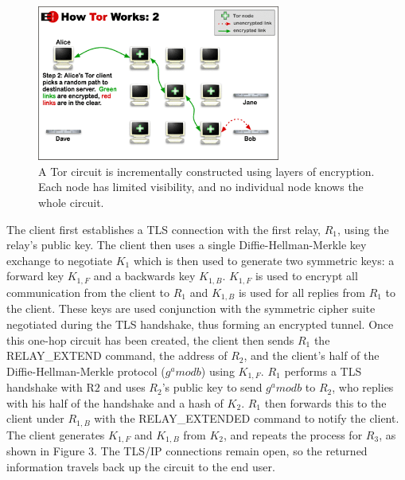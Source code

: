 \documentclass[journal]{IEEEtran}
\begin{document}
\begin{figure}[htbp]
\centering
\begin{minipage}{8 cm}
    \includegraphics[width=80mm]{resources/circuit-building-2.png}
    \caption{A Tor circuit is incrementally constructed using layers of encryption. Each node has limited visibility, and no individual node knows the whole circuit.\cite{TorOverview}}
\end{minipage}
\end{figure}

The client first establishes a TLS connection with the first relay, $R_{1}$, using the relay's public key. The client then uses a single Diffie-Hellman-Merkle key exchange to negotiate $K_{1}$ which is then used to generate two symmetric keys: a forward key $K_{1,F}$ and a backwards key $K_{1,B}$. $K_{1,F}$ is used to encrypt all communication from the client to $R_{1}$ and $K_{1,B}$ is used for all replies from $R_{1}$ to the client. These keys are used conjunction with the symmetric cipher suite negotiated during the TLS handshake, thus forming an encrypted tunnel. Once this one-hop circuit has been created, the client then sends $R_{1}$ the RELAY\_EXTEND command, the address of $R_{2}$, and the client's half of the Diffie-Hellman-Merkle protocol ($ g^a mod b $) using $K_{1,F}$. $R_{1}$ performs a TLS handshake with R${2}$ and uses $R_{2}$'s public key to send $ g^a mod b $ to $R_{2}$, who replies with his half of the handshake and a hash of $K_{2}$. $R_{1}$ then forwards this to the client under $R_{1,B}$ with the RELAY\_EXTENDED command to notify the client. The client generates $K_{1,F}$ and $K_{1,B}$ from $K_{2}$, and repeats the process for $R_{3}$,\cite{Ling2012} as shown in Figure 3. The TLS/IP connections remain open, so the returned information travels back up the circuit to the end user.
\end{document}
